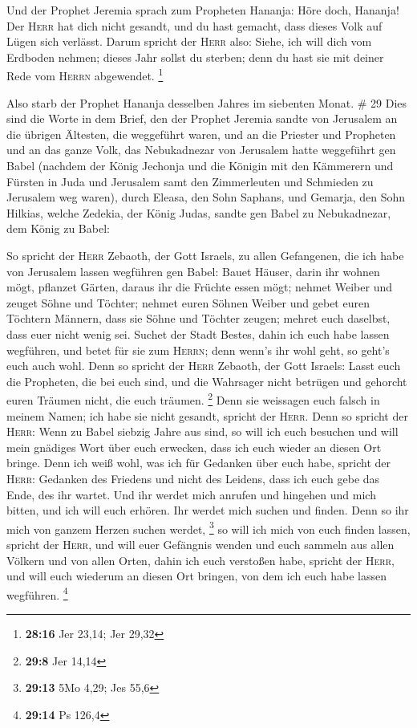  Und der Prophet Jeremia sprach zum Propheten Hananja:
Höre doch, Hananja! Der \textsc{Herr} hat dich nicht gesandt, und du
hast gemacht, dass dieses Volk auf Lügen sich verlässt. 
Darum spricht der \textsc{Herr} also: Siehe, ich will dich vom Erdboden
nehmen; dieses Jahr sollst du sterben; denn du hast sie mit deiner Rede
vom \textsc{Herrn} abgewendet. \footnote{\textbf{28:16} Jer 23,14; Jer
  29,32}

 Also starb der Prophet Hananja desselben Jahres im
siebenten Monat. \# 29  Dies sind die Worte in dem Brief,
den der Prophet Jeremia sandte von Jerusalem an die übrigen Ältesten,
die weggeführt waren, und an die Priester und Propheten und an das ganze
Volk, das Nebukadnezar von Jerusalem hatte weggeführt gen Babel
 (nachdem der König Jechonja und die Königin mit den
Kämmerern und Fürsten in Juda und Jerusalem samt den Zimmerleuten und
Schmieden zu Jerusalem weg waren),  durch Eleasa, den Sohn
Saphans, und Gemarja, den Sohn Hilkias, welche Zedekia, der König Judas,
sandte gen Babel zu Nebukadnezar, dem König zu Babel:

 So spricht der \textsc{Herr} Zebaoth, der Gott Israels,
zu allen Gefangenen, die ich habe von Jerusalem lassen wegführen gen
Babel:  Bauet Häuser, darin ihr wohnen mögt, pflanzet
Gärten, daraus ihr die Früchte essen mögt;  nehmet Weiber
und zeuget Söhne und Töchter; nehmet euren Söhnen Weiber und gebet euren
Töchtern Männern, dass sie Söhne und Töchter zeugen; mehret euch
daselbst, dass euer nicht wenig sei.  Suchet der Stadt
Bestes, dahin ich euch habe lassen wegführen, und betet für sie zum
\textsc{Herrn}; denn wenn's ihr wohl geht, so geht's euch auch wohl.
 Denn so spricht der \textsc{Herr} Zebaoth, der Gott
Israels: Lasst euch die Propheten, die bei euch sind, und die Wahrsager
nicht betrügen und gehorcht euren Träumen nicht, die euch träumen.
\footnote{\textbf{29:8} Jer 14,14}  Denn sie weissagen
euch falsch in meinem Namen; ich habe sie nicht gesandt, spricht der
\textsc{Herr}.  Denn so spricht der \textsc{Herr}: Wenn
zu Babel siebzig Jahre aus sind, so will ich euch besuchen und will mein
gnädiges Wort über euch erwecken, dass ich euch wieder an diesen Ort
bringe.  Denn ich weiß wohl, was ich für Gedanken über
euch habe, spricht der \textsc{Herr}: Gedanken des Friedens und nicht
des Leidens, dass ich euch gebe das Ende, des ihr wartet.
 Und ihr werdet mich anrufen und hingehen und mich
bitten, und ich will euch erhören.  Ihr werdet mich
suchen und finden. Denn so ihr mich von ganzem Herzen suchen werdet,
\footnote{\textbf{29:13} 5Mo 4,29; Jes 55,6}  so will ich
mich von euch finden lassen, spricht der \textsc{Herr}, und will euer
Gefängnis wenden und euch sammeln aus allen Völkern und von allen Orten,
dahin ich euch verstoßen habe, spricht der \textsc{Herr}, und will euch
wiederum an diesen Ort bringen, von dem ich euch habe lassen wegführen.
\footnote{\textbf{29:14} Ps 126,4}

